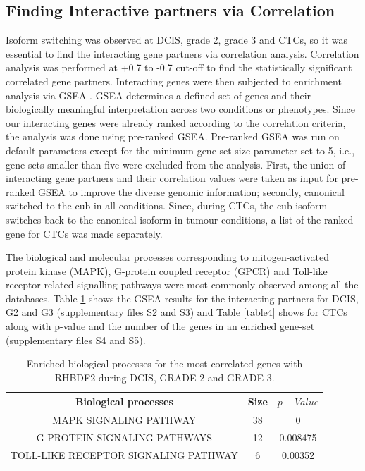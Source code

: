 \documentclass[fleqn,10pt,lineno]{wlpeerj}
\begin{document}
\subsection*{Finding Interactive partners via Correlation }
Isoform switching was observed at DCIS, grade 2, grade 3 and CTCs, so it was essential to find the interacting gene partners via correlation analysis. Correlation analysis was performed at +0.7 to -0.7 cut-off to find the statistically significant correlated gene partners. Interacting genes were then subjected to enrichment analysis via GSEA \citep{Subramanian2005}. GSEA determines a defined set of genes and their biologically meaningful interpretation across two conditions or phenotypes. Since our interacting genes were already ranked according to the correlation criteria, the analysis was done using pre-ranked GSEA. Pre-ranked GSEA was run on default parameters except for the minimum gene set size parameter set to 5, i.e., gene sets smaller than five were excluded from the analysis. First, the union of interacting gene partners and their correlation values were taken as input for pre-ranked GSEA to improve the diverse genomic information; secondly, canonical switched to the cub in all conditions. Since, during CTCs, the cub isoform switches back to the canonical isoform in tumour conditions, a list of the ranked gene for CTCs was made separately. 

The biological and molecular processes corresponding to mitogen-activated protein kinase (MAPK), G-protein coupled receptor (GPCR) and Toll-like receptor-related signalling pathways were most commonly observed among all the databases. Table \ref{table3} shows the GSEA results for the interacting partners for DCIS, G2 and G3 (supplementary files S2 and S3) and Table \ref{table4} shows for CTCs along with p-value and the number of the genes in an enriched gene-set (supplementary files S4 and S5).


\begin{table}[ht]
\begin{center}
\begin{tabular}{ |c|c|c| } 
\hline
Biological processes & Size & $p-Value$ \\
\hline
MAPK SIGNALING PATHWAY & 38 & 0 \\ 
\hline
G PROTEIN SIGNALING PATHWAYS & 12 & 0.008475\\
\hline
TOLL-LIKE RECEPTOR SIGNALING PATHWAY & 6 & 0.00352\\
\hline
\end{tabular}
\caption{\label{table3} Enriched biological processes for the most correlated genes with RHBDF2 during DCIS, GRADE 2 and GRADE 3.}
\end{center}
\end{table} 
\end{document}
